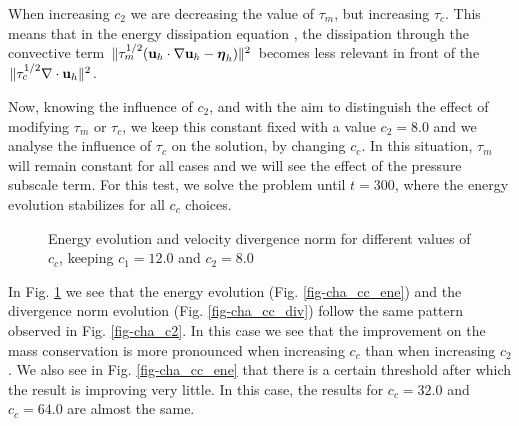 When increasing $c_2$ we are decreasing the value of $\tau_m$, but increasing $\tau_c$. This means that in the energy dissipation equation , the dissipation through the convective term $\|\tau_m^{1/2}({\bf u}_h\cdot\nabla{\bf u}_h-\boldsymbol{\eta}_h)\|^2$ becomes less relevant in front of the $\|\tau_c^{1/2}\nabla\cdot{\bf u}_h\|^2$.

Now, knowing the influence of $c_2$, and with the aim to distinguish the effect of modifying $\tau_m$ or $\tau_c$, we keep this constant fixed with a value $c_2=8.0$ and we analyse the influence of $\tau_c$ on the solution, by changing $c_c$. In this situation, $\tau_m$ will remain constant for all cases and we will see the effect of the pressure subscale term. For this test, we solve the problem until $t=300$, where the energy evolution stabilizes for all $c_c$ choices.
\begin{figure}[h!]
  \centering
  \caption{Energy evolution and velocity divergence norm for different values of $c_c$, keeping $c_1=12.0$ and $c_2=8.0$}
  \label{fig-cha_cc}
\end{figure}
In Fig. \ref{fig-cha_cc} we see that the energy evolution (Fig. \ref{fig-cha_cc_ene}) and the divergence norm evolution (Fig. \ref{fig-cha_cc_div}) follow the same pattern observed in Fig. \ref{fig-cha_c2}. In this case we see that the improvement on the mass conservation is more pronounced when increasing $c_c$ than when increasing $c_2$. We also see in Fig. \ref{fig-cha_cc_ene} that there is a certain threshold after which the result is improving very little. In this case, the results for $c_c=32.0$ and $c_c=64.0$ are almost the same.

